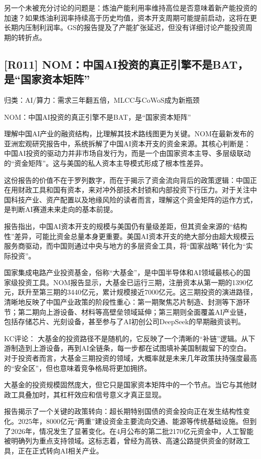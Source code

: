 \documentclass[11pt]{ctexart}
\begin{document}
另一个未被充分讨论的问题是：炼油产能利用率维持高位是否意味着新产能投资的加速？如果炼油利润率持续高于历史均值，资本开支周期可能提前启动，这将在更长期内压制利润率。GS的报告提及了产能扩张延迟，但没有详细讨论产能投资周期的转折点。

\subsection{[R011] NOM：中国AI投资的真正引擎不是BAT，是“国家资本矩阵”}
{\small\color{refgray}归类：AI/算力：需求三年翻五倍，MLCC与CoWoS成为新瓶颈}

NOM：中国AI投资的真正引擎不是BAT，是“国家资本矩阵”

理解中国AI产业的融资结构，比理解其技术路线图更为关键。NOM在最新发布的亚洲宏观研究报告中，系统拆解了中国AI资本开支的资金来源。其核心判断是：中国AI投资的驱动力并非市场自发行为，而是一个由国家资本主导、多层级联动的“资金矩阵”。这与美国的私人资本主导模式形成了根本性差异。

这份报告的价值不在于罗列数字，而在于揭示了资金流向背后的政策逻辑：中国正在用财政工具和国有资本，来对冲外部技术封锁和内部投资下行压力。对于关注中国科技产业、资产配置以及地缘风险的读者而言，理解这个资金矩阵的运作方式，是判断AI赛道未来走向的基本前提。

报告指出，中国AI资本开支的规模与美国仍有量级差距，但其资金来源的“结构性”差异，可能比资金总量本身更重要。美国AI资本开支的绝大部分由超大规模云服务商驱动，而中国则通过中央与地方的多层资金工具，将“国家战略”转化为“实际投资”。

国家集成电路产业投资基金，俗称“大基金”，是中国半导体和AI领域最核心的国家级投资工具。NOM报告显示，大基金已运行三期，注册资本从第一期的1390亿元，跃升至第三期的3440亿元，累计规模接近7000亿元。这三期投资的演进路径，清晰地反映了中国产业政策的阶段性重心：第一期聚焦芯片制造、封测等下游环节；第二期向上游设备、材料等高壁垒领域延伸；第三期则全面覆盖AI产业链，包括存储芯片、光刻设备，甚至参与了AI初创公司DeepSeek的早期融资谈判。

KC评论： 大基金的投资路径不是随机的，它反映了一个清晰的“补链”逻辑。从下游制造到上游设备，再到AI全链条，每一步都在试图填补美国制裁留下的空白。对于投资者而言，大基金三期投资的领域，大概率就是未来几年政策扶持强度最高的“安全区”，但也意味着竞争格局将更加拥挤。

大基金的投资规模固然庞大，但它只是国家资本矩阵中的一个节点。当它与其他财政工具叠加时，其杠杆效应和信号意义才真正显现。

报告揭示了一个关键的政策转向：超长期特别国债的资金投向正在发生结构性变化。2025年，8000亿元“两重”建设资金主要流向交通、能源等传统基础设施。但到了2026年，情况发生了显著变化。在4月公布的第二批2170亿元资金中，人工智能被明确列为重点支持领域。这标志着，曾经为高铁、高速公路提供资金的财政工具，正在正式转向AI相关产业。
\end{document}

